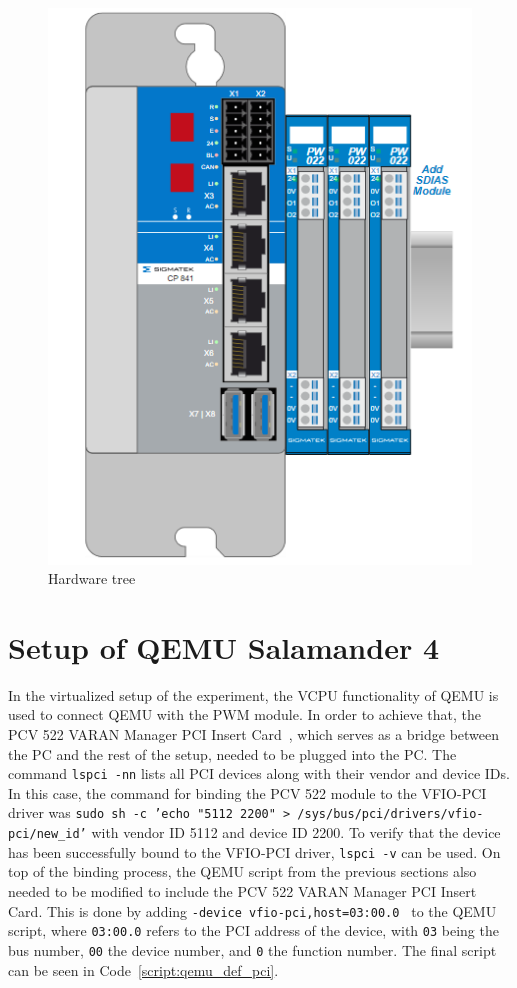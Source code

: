 \documentclass[MMR,Master,english]{twbook}
\begin{document}
\begin{figure}[H]
	\centering
	\includegraphics[width=0.5\columnwidth]{img/experiment/hardware_tree.png}
	\caption[Hardware tree]{Hardware tree}
	\label{fig:hardware_tree}
\end{figure}

\section{Setup of QEMU Salamander 4}\label{sec:setup_experiment_virtualized}
In the virtualized setup of the experiment, the VCPU functionality of QEMU is used to connect QEMU with the PWM module. In order to achieve that, the PCV 522 VARAN Manager PCI Insert Card~\cite{ControlsHMIsSIGMATEK}, which serves as a bridge between the PC and the rest of the setup, needed to be plugged into the PC. The command \texttt{lspci -nn} lists all PCI devices along with their vendor and device IDs. In this case, the command for binding the PCV 522 module to the VFIO-PCI driver was \texttt{sudo sh -c 'echo "5112 2200" > /sys/bus/pci/drivers/vfio-pci/new\_id'} with vendor ID 5112 and device ID 2200.  To verify that the device has been successfully bound to the VFIO-PCI driver, \texttt{lspci -v} can be used. On top of the binding process, the QEMU script from the previous sections also needed to be modified to include the PCV 522 VARAN Manager PCI Insert Card. This is done by adding \texttt{-device\ vfio-pci,host=03:00.0 } to the QEMU script, where \texttt{03:00.0} refers to the PCI address of the device, with \texttt{03} being the bus number, \texttt{00} the device number, and \texttt{0} the function number. The final script can be seen in Code~\ref{script:qemu_def_pci}.
\end{document}
